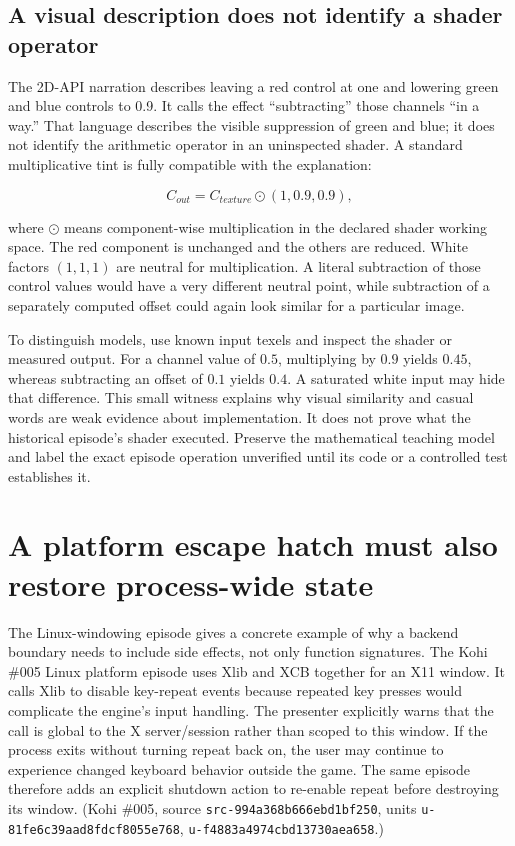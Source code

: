 \subsection{A visual description does not identify a shader operator}\label{01-foundations-i-ch016-a-visual-description-does-not-identify-a-shader-operator}

The 2D-API narration describes leaving a red control at one and lowering green and blue controls to 0.9. It calls the effect ``subtracting'' those channels ``in a way.'' That language describes the visible suppression of green and blue; it does not identify the arithmetic operator in an uninspected shader. A standard multiplicative tint is fully compatible with the explanation:

\[
C_{out}=C_{texture}\odot(1,0.9,0.9),
\]

where \(\odot\) means component-wise multiplication in the declared shader working space. The red component is unchanged and the others are reduced. White factors \((1,1,1)\) are neutral for multiplication. A literal subtraction of those control values would have a very different neutral point, while subtraction of a separately computed offset could again look similar for a particular image.

To distinguish models, use known input texels and inspect the shader or measured output. For a channel value of \(0.5\), multiplying by \(0.9\) yields \(0.45\), whereas subtracting an offset of \(0.1\) yields \(0.4\). A saturated white input may hide that difference. This small witness explains why visual similarity and casual words are weak evidence about implementation. It does not prove what the historical episode's shader executed. Preserve the mathematical teaching model and label the exact episode operation unverified until its code or a controlled test establishes it.

\section{A platform escape hatch must also restore process-wide state}\label{01-foundations-i-ch016-a-platform-escape-hatch-must-also-restore-process-wide-state}

The Linux-windowing episode gives a concrete example of why a backend boundary needs to include side effects, not only function signatures. The Kohi \#005 Linux platform episode uses Xlib and XCB together for an X11 window. It calls Xlib to disable key-repeat events because repeated key presses would complicate the engine's input handling. The presenter explicitly warns that the call is global to the X server/session rather than scoped to this window. If the process exits without turning repeat back on, the user may continue to experience changed keyboard behavior outside the game. The same episode therefore adds an explicit shutdown action to re-enable repeat before destroying its window. (Kohi \#005, source \texttt{src-994a368b666ebd1bf250}, units \texttt{u-81fe6c39aad8fdcf8055e768}, \texttt{u-f4883a4974cbd13730aea658}.)

